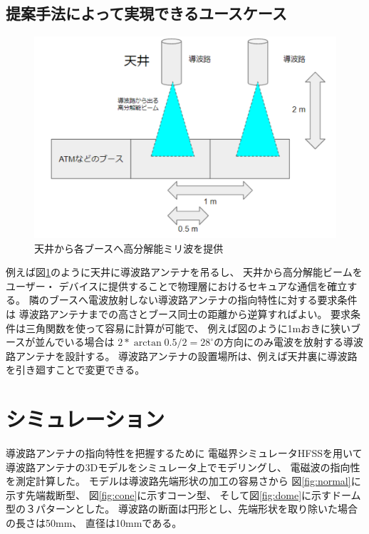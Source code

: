 \documentclass[technicalreport]{ieicej}
\begin{document}
\subsection{提案手法によって実現できるユースケース}

\begin{figure}[tb]
  \vspace{20mm}
  \begin{center}
    \includegraphics[bb=0 0 384 262, width=0.7\linewidth]{img/usecase.pdf}
    \caption{天井から各ブースへ高分解能ミリ波を提供}
    \label{fig:usecase}
  \end{center}
\end{figure}


例えば図\ref{fig:usecase}のように天井に導波路アンテナを吊るし、
天井から高分解能ビームをユーザー・
デバイスに提供することで物理層におけるセキュアな通信を確立する。
隣のブースへ電波放射しない導波路アンテナの指向特性に対する要求条件は
導波路アンテナまでの高さとブース同士の距離から逆算すればよい。
要求条件は三角関数を使って容易に計算が可能で、
例えば図のように1mおきに狭いブースが並んでいる場合は
$2 * \arctan 0.5 / 2 = 28^{\circ}$の方向にのみ電波を放射する導波路アンテナを設計する。
導波路アンテナの設置場所は、例えば天井裏に導波路を引き廻すことで変更できる。

\section{シミュレーション}

導波路アンテナの指向特性を把握するために 
電磁界シミュレータHFSSを用いて導波路アンテナの3Dモデルをシミュレータ上でモデリングし、
電磁波の指向性を測定計算した。
モデルは導波路先端形状の加工の容易さから
図\ref{fig:normal}に示す先端裁断型、
図\ref{fig:cone}に示すコーン型、
そして図\ref{fig:dome}に示すドーム型の３パターンとした。
導波路の断面は円形とし、先端形状を取り除いた場合の長さは50mm、
直径は10mmである。
\end{document}
